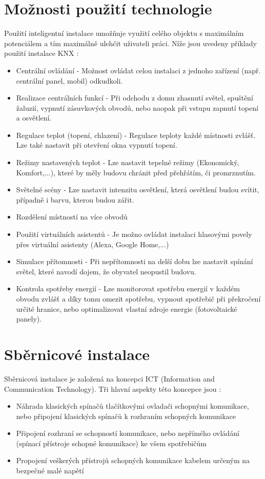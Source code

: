 \section{Možnosti použití technologie}
Použití inteligentní instalace umožňuje využití celého objektu s maximálním potenciálem a tím maximálně ulehčit uživateli práci. Níže jsou uvedeny příklady použití instalace KNX \cite{Systemove Argumenty}:
\begin{itemize}
    \item{Centrální ovládání - Možnost ovládat celou instalaci z jednoho zařízení (např. centrální panel, mobil) odkudkoli.}
    \item Realizace centrálních funkcí - Při odchodu z domu zhasnutí světel, spuštění žaluzií, vypnutí zásuvkových obvodů, nebo naopak při vstupu zapnutí topení a osvětlení.
    \item Regulace teplot (topení, chlazení) - Regulace teploty každé místnosti zvlášť. Lze také nastavit při otevření okna vypnutí topení.
    \item Režimy nastavených teplot - Lze nastavit tepelné režimy (Ekonomický, Komfort,...), které by měly budovu chránit před přehřátím, či promrznutím. 
    \item Světelné scény -  Lze nastavit intenzitu osvětlení, která osvětlení budou svítit, případně i barvu, kterou budou zářit.
    \item Rozdělení místností na více obvodů
    \item Použití virtuálních asistentů - Je možno ovládat instalaci hlasovými povely přes virtuální asistenty (Alexa, Google Home,...)
    \item Simulace přítomnosti - Při nepřítomnosti na delší dobu lze nastavit spínání světel, které navodí dojem, že obyvatel neopustil budovu.
    \item Kontrola spotřeby energií - Lze monitorovat spotřebu energií v každém obvodu zvlášť a díky tomu omezit spotřebu, vypnout spotřebič při překročení určité hranice, nebo optimalizovat vlastní zdroje energie (fotovoltaické panely).
\end{itemize}

\section{Sběrnicové instalace}
Sběrnicová instalace je založená na koncepci ICT (Information and Communication Technology). Tři hlavní aspekty této koncepce jsou \cite{KNX principles}:
\begin{itemize}
\item Náhrada klasických spínačů tlačítkovými ovladači schopnými komunikace, nebo připojení klasických spínačů k rozhraním schopných komunikace
\item Připojení rozhraní se schopností komunikace, nebo nepřímého ovládání (spínací přístroje schopné komunikace) ke všem spotřebičům
\item Propojení veškerých přístrojů schopných komunikace kabelem určeným na bezpečné malé napětí
\end{itemize}

